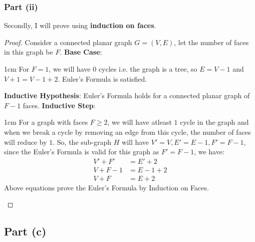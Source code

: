 \documentclass{article}
\let\bold\textbf
\newenvironment{myenv}{\begin{adjustwidth}{1cm}{}}{\end{adjustwidth}}
\begin{document}
{{    \subsubsection{Part (ii)}{
      Secondly, I will prove using \bold{induction on faces}.
      \begin{proof}
        Consider a connected planar graph $G=(V,E)$, let the number of faces in this graph be $F$. \newline
        \bold{Base Case}:
        \begin{myenv}
          For $F=1$, we will have $0$ cycles i.e. the graph is a tree, so $E=V-1$ and $V+1=V-1+2$. Euler's Formula is satisfied.
        \end{myenv}
        \bold{Inductive Hypothesis}: Euler's Formula holds for a connected planar graph of $F-1$ faces. \newline
        \bold{Inductive Step}:
        \begin{myenv}
          For a graph with faces $F \geq 2$, we will have atleast $1$ cycle in the graph and when we break a cycle by removing an edge from this cycle, the number of faces will reduce by $1$. \newline
          So, the sub-graph $H$ will have $V'=V,E'=E-1,F'=F-1$, since the Euler's Formula is valid for this graph as $F'=F-1$, we have:
          \begin{align*}
            V'+F'&=E'+2 \\
            V+F-1&=E-1+2 \\
            V+F&=E+2
          \end{align*}
          Above equations prove the Euler's Formula by Induction on Faces.
        \end{myenv}
      \end{proof}
    }
  }
  \subsection{Part (c)}{
}}
\end{document}
